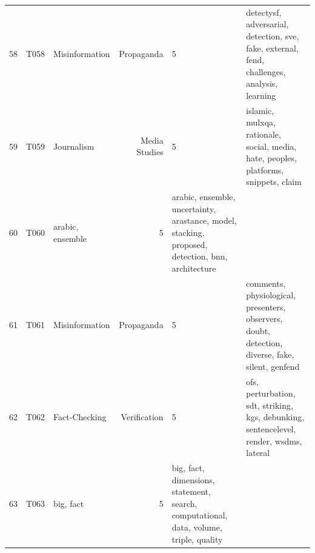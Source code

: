 \begin{tabular}{rllrl}
58 & T058 & Misinformation & Propaganda & 5 & detectysf, adversarial, detection, sve, fake, external, fend, challenges, analysis, learning \\
59 & T059 & Journalism & Media Studies & 5 & islamic, mulxqa, rationale, social, media, hate, peoples, platforms, snippets, claim \\
60 & T060 & arabic, ensemble & 5 & arabic, ensemble, uncertainty, arastance, model, stacking, proposed, detection, bnn, architecture \\
61 & T061 & Misinformation & Propaganda & 5 & comments, physiological, presenters, observers, doubt, detection, diverse, fake, silent, genfend \\
62 & T062 & Fact-Checking & Verification & 5 & ofs, perturbation, sdt, striking, kgs, debunking, sentencelevel, render, wsdms, lateral \\
63 & T063 & big, fact & 5 & big, fact, dimensions, statement, search, computational, data, volume, triple, quality \\
\bottomrule
\end{tabular}
